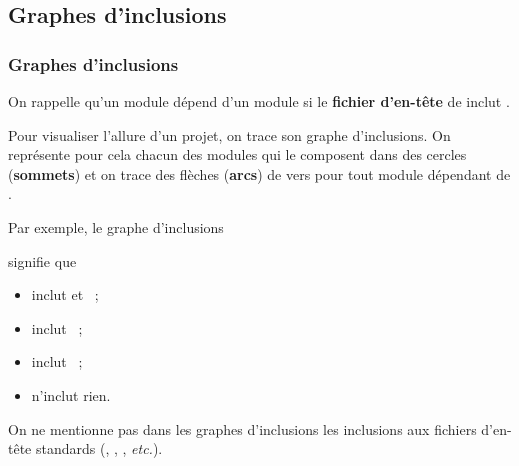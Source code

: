 \subsection{Graphes d'inclusions}

\begin{frame}[fragile]
\frametitle{Graphes d'inclusions}
On rappelle qu'un module  \alert{dépend} d'un module  si
le {\bf fichier d'en-tête} de  inclut .
\medskip

Pour visualiser l'allure d'un projet, on trace son \alert{graphe d'inclusions}.
On représente pour cela chacun des modules qui le composent dans des cercles
({\bf sommets}) et on trace des flèches ({\bf arcs}) de  vers
 pour tout module  dépendant de .
\medskip

Par exemple, le graphe d'inclusions
\begin{multicols}{2}
\begin{center}
\end{center}
signifie que
\begin{itemize}
    \item {} inclut  et ~;
    \item {} inclut ~;
    \item {} inclut ~;
    \item {} n'inclut rien.
\end{itemize}
\end{multicols}
\medskip

On ne mentionne pas dans les graphes d'inclusions les inclusions aux
fichiers d'en-tête standards (, ,
, {\em etc.}).
\end{frame}

